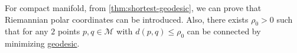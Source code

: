\begin{remark}
	For compact manifold, from \autoref{thm:shortest-geodesic}, we can prove that Riemannian polar coordinates can be introduced. Also, there exists \(\rho _0 > 0\) such that for any \(2\) points \(p, q\in \mathcal{M} \) with \(d(p, q) \leq \rho _0\) can be connected by minimizing \hyperref[def:geodesic]{geodesic}.
\end{remark}